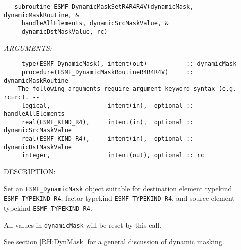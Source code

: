 \begin{verbatim}   subroutine ESMF_DynamicMaskSetR4R4R4V(dynamicMask, dynamicMaskRoutine, &
     handleAllElements, dynamicSrcMaskValue, &
     dynamicDstMaskValue, rc)\end{verbatim}{\em ARGUMENTS:}
\begin{verbatim}     type(ESMF_DynamicMask), intent(out)           :: dynamicMask
     procedure(ESMF_DynamicMaskRoutineR4R4R4V)     :: dynamicMaskRoutine
 -- The following arguments require argument keyword syntax (e.g. rc=rc). --
     logical,                intent(in),  optional :: handleAllElements
     real(ESMF_KIND_R4),     intent(in),  optional :: dynamicSrcMaskValue
     real(ESMF_KIND_R4),     intent(in),  optional :: dynamicDstMaskValue
     integer,                intent(out), optional :: rc
           \end{verbatim}
{\sf DESCRIPTION:\\ }


     \label{api:DynamicMaskSetR4R4R4V}
     Set an {\tt ESMF\_DynamicMask} object suitable for 
     destination element typekind {\tt ESMF\_TYPEKIND\_R4},
     factor typekind {\tt ESMF\_TYPEKIND\_R4}, and
     source element typekind {\tt ESMF\_TYPEKIND\_R4}.
     
     All values in {\tt dynamicMask} will be reset by this call.
  
     See section \ref{RH:DynMask} for a general discussion of dynamic masking.
  
